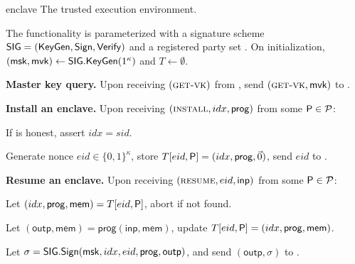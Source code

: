 \begin{cccFunctionality}
	{\funcEnclave}
	{enclave}
	{The trusted execution environment.}

	The functionality is parameterized with a signature scheme $\mathsf{SIG} = (\mathsf{KeyGen}, \mathsf{Sign}, \mathsf{Verify})$ and a registered party set \partyset.
	On initialization, $(\mathsf{msk}, \mathsf{mvk}) \gets \mathsf{SIG}.\mathsf{KeyGen}(1^\kappa)$ and $T \gets \emptyset$.

	\begin{cccItemize}[noitemsep]
		\item \textbf{Master key query.} Upon receiving $(\textsc{get-vk})$ from \party, send $(\textsc{get-vk}, \mathsf{mvk})$ to \party.

		\item \textbf{Install an enclave.} Upon receiving $(\textsc{install}, idx, \mathsf{prog})$ from some $\mathsf{P} \in \mathcal{P}$:
		\begin{cccEnum}[nosep]
			\item If \party is honest, assert $idx = sid$.
			\item Generate nonce $eid \in \{0, 1\}^\kappa$, store $T[eid, \mathsf{P}] = (idx, \mathsf{prog}, \vec{0})$, send $eid$ to \party.
		\end{cccEnum}

		\item \textbf{Resume an enclave.} Upon receiving $(\textsc{resume}, eid, \mathsf{inp})$ from some $\mathsf{P} \in \mathcal{P}$:
		\begin{cccEnum}[nosep]
			\item Let $(idx, \mathsf{prog}, \mathsf{mem}) = T[eid, \mathsf{P}]$, abort if not found.
			\item Let $(\mathsf{outp, mem}) = \mathsf{prog}(\mathsf{inp}, \mathsf{mem})$, update $T[eid, \mathsf{P}] = (idx, \mathsf{prog}, \mathsf{mem})$.
			\item Let $\sigma = \mathsf{SIG}.\mathsf{Sign}(\mathsf{msk}, idx, eid, \mathsf{prog}, \mathsf{outp})$, and send $(\mathsf{outp}, \sigma)$ to \party.
		\end{cccEnum}
	\end{cccItemize}
\end{cccFunctionality}
